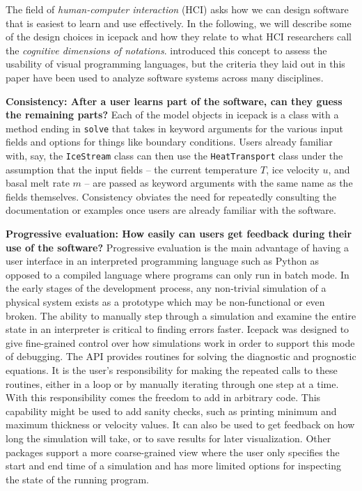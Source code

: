 \documentclass[journal abbreviation, manuscript]{copernicus}
\begin{document}
The field of \emph{human-computer interaction} (HCI) asks how we can design software that is easiest to learn and use effectively.
In the following, we will describe some of the design choices in icepack and how they relate to what HCI researchers call the \emph{cognitive dimensions of notations}.
\citet{green1996usability} introduced this concept to assess the usability of visual programming languages, but the criteria they laid out in this paper have been used to analyze software systems across many disciplines.

\textbf{Consistency: After a user learns part of the software, can they guess the remaining parts?}
Each of the model objects in icepack is a class with a method ending in \texttt{solve} that takes in keyword arguments for the various input fields and options for things like boundary conditions.
Users already familiar with, say, the \texttt{IceStream} class can then use the \texttt{HeatTransport} class under the assumption that the input fields -- the current temperature $T$, ice velocity $u$, and basal melt rate $m$ -- are passed as keyword arguments with the same name as the fields themselves.
Consistency obviates the need for repeatedly consulting the documentation or examples once users are already familiar with the software.

\textbf{Progressive evaluation: How easily can users get feedback during their use of the software?}
Progressive evaluation is the main advantage of having a user interface in an interpreted programming language such as Python as opposed to a compiled language where programs can only run in batch mode.
In the early stages of the development process, any non-trivial simulation of a physical system exists as a prototype which may be non-functional or even broken.
The ability to manually step through a simulation and examine the entire state in an interpreter is critical to finding errors faster.
Icepack was designed to give fine-grained control over how simulations work in order to support this mode of debugging.
The API provides routines for solving the diagnostic and prognostic equations.
It is the user's responsibility for making the repeated calls to these routines, either in a loop or by manually iterating through one step at a time.
With this responsibility comes the freedom to add in arbitrary code.
This capability might be used to add sanity checks, such as printing minimum and maximum thickness or velocity values.
It can also be used to get feedback on how long the simulation will take, or to save results for later visualization.
Other packages support a more coarse-grained view where the user only specifies the start and end time of a simulation and has more limited options for inspecting the state of the running program.
\end{document}

